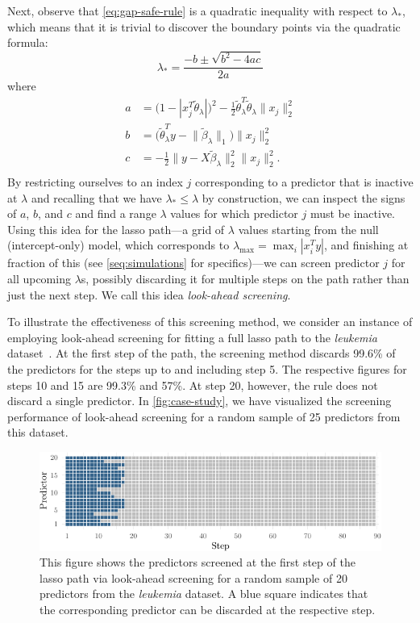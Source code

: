 \documentclass[b5paper,10pt,abstractoff,DIV=calc,headings=normal,twoside]{scrartcl}
\theoremstyle{plain}
\theoremstyle{definition}
\theoremstyle{remark}
\begin{document}
Next, observe that \eqref{eq:gap-safe-rule} is a quadratic inequality with
respect to \(\lambda_*\), which
means that it is trivial to discover the boundary points via the
quadratic formula:
\[
  \lambda_* = \frac{-b \pm \sqrt{b^2 - 4ac}}{2a}
\]
where
\[
  \begin{aligned}
    a & = \big( 1 - | x_j^T \tilde\theta_\lambda|\big)^2 -
    \frac 12 \tilde\theta_\lambda^T \tilde\theta_\lambda \lVert x_j\rVert_2^2      \\
    b & = \big(\tilde\theta_\lambda^T y - \lVert \tilde\beta_\lambda \rVert_1\big)
    \lVert x_j \rVert_2^2                                                          \\
    c & = - \frac 12 \lVert y - X\tilde\beta_\lambda\rVert_2^2
    \lVert x_j\rVert_2^2.                                                          \\
  \end{aligned}
\]
By restricting ourselves to an index \(j\) corresponding to a predictor that is
inactive at \(\lambda\) and recalling that we have \(\lambda_* \leq \lambda\) by
construction, we can inspect the signs of \(a\), \(b\), and \(c\) and find a
range \(\lambda\) values for which predictor \(j\) must be inactive. Using this
idea for the lasso path---a grid of \(\lambda\) values starting from the null
(intercept-only) model, which corresponds to \(\lambda_\text{max} =
\max_i|x_i^Ty|\), and finishing at fraction of this (see
\autoref{seq:simulations} for specifics)---we can screen predictor \(j\) for all
upcoming \(\lambda\)s, possibly discarding it for multiple steps on the path
rather than just the next step. We call this idea \emph{look-ahead screening}.

To illustrate the effectiveness of this screening method, we consider an
instance of employing look-ahead screening for fitting a full lasso path to the
\emph{leukemia} dataset~\citep{golub1999}.  At the first step of the path, the
screening method discards 99.6\% of the predictors for the steps up to and
including step 5. The respective figures for steps 10 and 15 are 99.3\% and
57\%.  At step 20, however, the rule does not discard a single predictor.  In
\autoref{fig:case-study}, we have visualized the screening performance of
look-ahead screening for a random sample of 25 predictors from this dataset.

\begin{figure}[hbtp]
  \centering
  \includegraphics{figures/casestudy.pdf}
  \caption{This figure shows the predictors screened at the first step of the
    lasso path via look-ahead screening for a random sample of
    20 predictors from the \emph{leukemia}
    dataset. A blue square indicates that the corresponding predictor can
    be discarded at the respective step.\label{fig:case-study}}
\end{figure}
\end{document}
